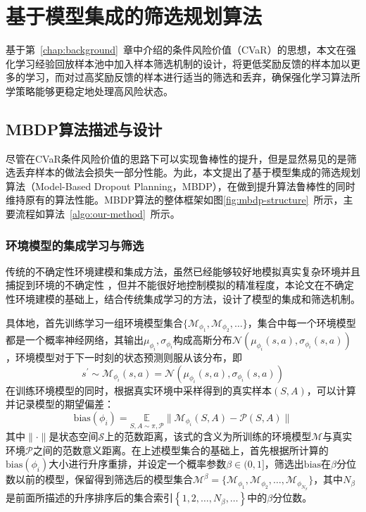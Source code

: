 
\chapter{基于模型集成的筛选规划算法}\label{chap:mbdp}

基于第~\ref{chap:background}~章中介绍的条件风险价值（CVaR）的思想，本文在强化学习经验回放样本池中加入样本筛选机制的设计，将更低奖励反馈的样本加以更多的学习，而对过高奖励反馈的样本进行适当的筛选和丢弃，确保强化学习算法所学策略能够更稳定地处理高风险状态。

\section{MBDP算法描述与设计}

尽管在CVaR条件风险价值的思路下可以实现鲁棒性的提升，但是显然易见的是筛选丢弃样本的做法会损失一部分性能。为此，本文提出了基于模型集成的筛选规划算法（Model-Based Dropout Planning，MBDP），在做到提升算法鲁棒性的同时维持原有的算法性能。MBDP算法的整体框架如图\ref{fig:mbdp-structure}~所示，主要流程如算法~\ref{algo:our-method}~所示。

\subsection{环境模型的集成学习与筛选}\label{sec:model-method}

传统的不确定性环境建模和集成方法，虽然已经能够较好地模拟真实复杂环境并且捕捉到环境的不确定性 \cite{duan2007multi,zhang2021mbdp}，但并不能很好地控制模拟的精准程度，本论文在不确定性环境建模的基础上，结合传统集成学习的方法，设计了模型的集成和筛选机制。

具体地，首先训练学习一组环境模型集合$\{\mathcal{M}_{\phi_1},\mathcal{M}_{\phi_2},\ldots\}$，集合中每一个环境模型都是一个概率神经网络，其输出$\mu_{\phi_i},\sigma_{\phi_i}$构成高斯分布$\mathcal{N}(\mu_{\phi_i}(s,a),\sigma_{\phi_i}(s,a))$，环境模型对于下一时刻的状态预测则服从该分布，即
\begin{equation}
    s^\prime \sim \mathcal{M}_{\phi_i}(s,a) = \mathcal{N}(\mu_{\phi_i}(s,a),\sigma_{\phi_i}(s,a))
\end{equation}
在训练环境模型的同时，根据真实环境中采样得到的真实样本$(S,A)$，可以计算并记录模型的期望偏差：
\begin{equation}
    \mathrm{bias}(\phi_i) = \underset{S,A\sim \pi,\mathcal{P}}{\mathbb{E}}\|\mathcal{M}_{\phi_i}(S,A)-\mathcal{P}(S,A)\|
\end{equation}
其中$\|\cdot\|$是状态空间$\mathcal{S}$上的范数距离，该式的含义为所训练的环境模型$\mathcal{M}$与真实环境$\mathcal{P}$之间的范数意义距离。在上述模型集合的基础上，首先根据所计算的$\mathrm{bias}(\phi_i)$大小进行升序重排，并设定一个概率参数$\beta\in(0,1]$，筛选出$\mathrm{bias}$在$\beta$分位数以前的模型，保留得到筛选后的模型集合$\mathcal{M}^\beta = \{\mathcal{M}_{\phi_1},\mathcal{M}_{\phi_2},\ldots,\mathcal{M}_{\phi_{N_\beta}}\}$，其中$N_\beta$是前面所描述的升序排序后的集合索引$\left\{1,2,\ldots,N_\beta,\ldots\right\}$中的$\beta$分位数。

